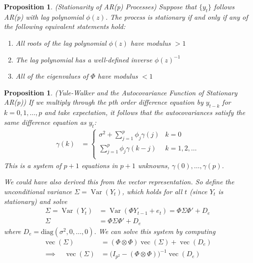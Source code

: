 \documentclass[12pt]{article}
\theoremstyle{plain}
\newtheorem{prop}[thm]{Proposition}
\theoremstyle{definition}
\theoremstyle{remark}
\newcommand{\diag}{\text{diag}}
\newcommand{\vc}{\operatorname{vec}}
\newcommand{\Var}{\operatorname{Var}}
\begin{document}
\begin{prop}\emph{(Stationarity of AR(p) Processes)}
\label{prop:stationaryar}
Suppose that $\{y_t\}$ follows AR(p) with lag polynomial $\phi(z)$.  The
process is stationary if and only if any of the following equivalent
statements hold:
\begin{enumerate}[label=\emph{(\roman*)}]
  \item All roots of the lag polynomial $\phi(z)$ have modulus $>1$
  \item The lag polynomial has a well-defined inverse $\phi(z)^{-1}$
  \item All of the eigenvalues of $\Phi$ have modulus $<1$
\end{enumerate}
\end{prop}

\begin{prop}
\emph{(Yule-Walker and the Autocovariance Function of Stationary AR(p))}
If we multiply through the $p$th order difference equation by $y_{t-k}$
for $k=0,1,\ldots,p$ and take expectation, it follows that the
autocovariances satisfy the same difference equation as $y_t$:
\begin{align*}
  \gamma(k)
  &=
  \begin{cases}
    \sigma^2 + \sum_{j=1}^p \phi_j\gamma(j)
    & k = 0 \\
    \sum_{j=1}^p \phi_j\gamma(k-j)
    & k = 1,2,\ldots \\
  \end{cases}
\end{align*}
This is a system of $p+1$ equations in $p+1$ unknowns,
$\gamma(0),\ldots,\gamma(p)$.

We could have also derived this from the vector representation. So
define the unconditional variance $\Sigma=\Var(Y_t)$, which holds for
all $t$ (since $Y_t$ is stationary) and solve
\begin{align*}
  \Sigma = \Var(Y_t)
  &= \Var(\Phi Y_{t-1} + e_t)
  = \Phi \Sigma\Phi' + D_e \\
  \Sigma
  &= \Phi \Sigma\Phi' + D_e
\end{align*}
where $D_e=\diag(\sigma^2,0,\ldots,0)$. We can solve this system by
computing
\begin{align*}
  \vc(\Sigma) &= (\Phi\otimes\Phi)\vc(\Sigma) + \vc(D_e) \\
  \implies\quad
  \vc(\Sigma) &= \big(I_{p^2}-(\Phi\otimes\Phi)\big)^{-1}\vc(D_e)
\end{align*}

\end{prop}
\end{document}
